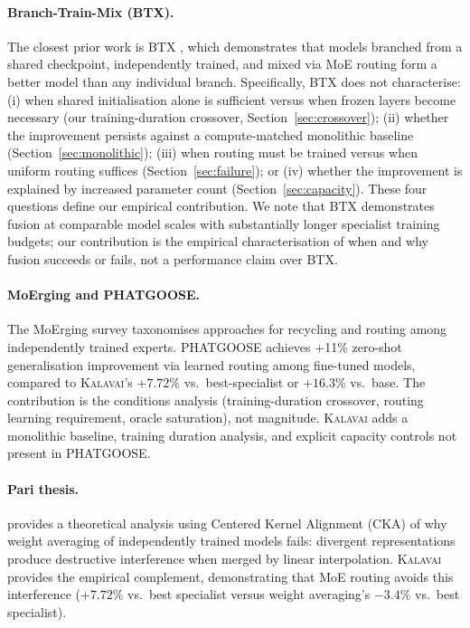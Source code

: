 \documentclass{article}
\newcommand{\kalavai}{\textsc{Kalavai}\xspace}
\begin{document}
\paragraph{Branch-Train-Mix (BTX).} The closest prior work is BTX \citep{sukhbaatar2024branchtrainmix}, which demonstrates that models branched from a shared checkpoint, independently trained, and mixed via MoE routing form a better model than any individual branch. Specifically, BTX does not characterise: (i) when shared initialisation alone is sufficient versus when frozen layers become necessary (our training-duration crossover, Section~\ref{sec:crossover}); (ii) whether the improvement persists against a compute-matched monolithic baseline (Section~\ref{sec:monolithic}); (iii) when routing must be trained versus when uniform routing suffices (Section~\ref{sec:failure}); or (iv) whether the improvement is explained by increased parameter count (Section~\ref{sec:capacity}). These four questions define our empirical contribution. We note that BTX demonstrates fusion at comparable model scales with substantially longer specialist training budgets; our contribution is the empirical characterisation of when and why fusion succeeds or fails, not a performance claim over BTX.

\paragraph{MoErging and PHATGOOSE.} The MoErging survey \citep{yadav2024merging} taxonomises approaches for recycling and routing among independently trained experts. PHATGOOSE \citep{muqeeth2024phatgoose} achieves +11\% zero-shot generalisation improvement via learned routing among fine-tuned models, compared to \kalavai's $+7.72\%$ vs.\ best-specialist or $+16.3\%$ vs.\ base. The contribution is the conditions analysis (training-duration crossover, routing learning requirement, oracle saturation), not magnitude. \kalavai adds a monolithic baseline, training duration analysis, and explicit capacity controls not present in PHATGOOSE.

\paragraph{Pari thesis.} \citet{pari2025merging} provides a theoretical analysis using Centered Kernel Alignment (CKA) of why weight averaging of independently trained models fails: divergent representations produce destructive interference when merged by linear interpolation. \kalavai provides the empirical complement, demonstrating that MoE routing avoids this interference ($+7.72\%$ vs.\ best specialist versus weight averaging's $-3.4\%$ vs.\ best specialist).
\end{document}
